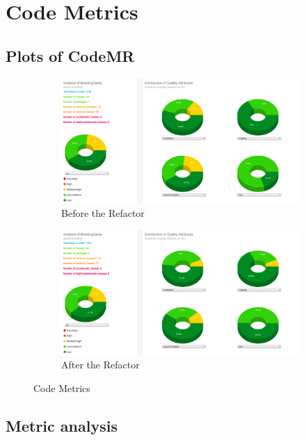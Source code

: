 
\section{Code Metrics}

\subsection{Plots of CodeMR}

\begin{figure}[H]
    \centering
    \begin{subfigure}{\textwidth}
        \includegraphics[width = \textwidth]{img/stats_pre.png}
        \caption{Before the Refactor}
    \end{subfigure}
    \begin{subfigure}{\textwidth}
        \includegraphics[width = \textwidth]{img/stats_post.png}
        \caption{After the Refactor}
    \end{subfigure}
    \caption{Code Metrics}
\end{figure}

\subsection{Metric analysis}

